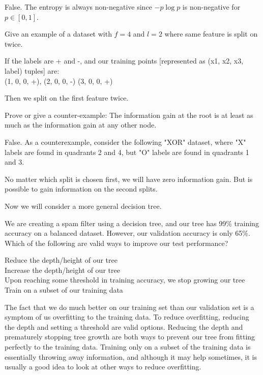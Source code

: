 \begin{Parts}
\begin{solution}
  False. The entropy is always non-negative since $-p \log p$ is non-negative for $p \in [0, 1]$.
\end{solution}

\Part Give an example of a dataset with $f=4$ and $l=2$ where same feature is split on twice.

\begin{solution}
  If the labels are + and -, and our training points [represented as (x1, x2, x3, label) tuples] are: \\

  (1, 0, 0, +), (2, 0, 0, -) (3, 0, 0, +)

Then we split on the first feature twice.
\end{solution}


\Part Prove or give a counter-example: The information gain at the root is at least as much as the information gain at any other node.

\begin{solution}
False. As a counterexample, consider the following "XOR" dataset, where "X" labels are found in quadrants 2 and 4, but "O" labels are found in quadrants 1 and 3.

No matter which split is chosen first, we will have zero information gain. But is possible to
gain information on the second splits.
\end{solution}

Now we will consider a more general decision tree. 

\Part We are creating a spam filter using a decision tree, and our tree has 99\% training accuracy on a balanced dataset. However, our validation accuracy is only 65\%. Which of the following are valid ways to improve our test performance?


Reduce the depth/height of our tree\\
Increase the depth/height of our tree\\
Upon reaching some threshold in training accuracy, we stop growing our tree\\
Train on a subset of our training data\\

\begin{solution}
The fact that we do much better on our training set than our validation set is a symptom of us overfitting to the training data. To reduce overfitting, reducing the depth and setting a threshold are valid options. Reducing the depth and prematurely stopping tree growth are both ways to prevent our tree from fitting perfectly to the training data. Training only on a subset of the training data is essentially throwing away information, and although it may help sometimes, it is usually a good idea to look at other ways to reduce overfitting. 
\end{solution}

\end{Parts}

\newpage

